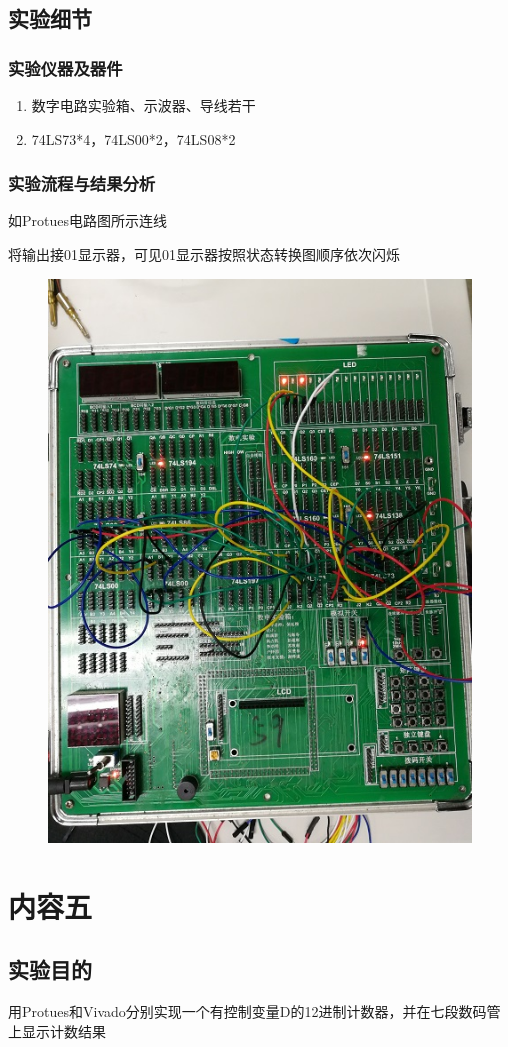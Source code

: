 \documentclass[11pt,UTF8]{ctexart}
\begin{document}
\subsection{实验细节}
\subsubsection{实验仪器及器件}
\begin{enumerate}
    \item 数字电路实验箱、示波器、导线若干
    \item 74LS73*4，74LS00*2，74LS08*2
\end{enumerate}

\subsubsection{实验流程与结果分析}
\par 如Protues电路图所示连线
\par 将输出接01显示器，可见01显示器按照状态转换图顺序依次闪烁
\begin{figure}[H]
    \centering
    \includegraphics[width=0.6\linewidth]{fig/broad_12system.jpg}
\end{figure}



\section{内容五}
\subsection{实验目的}
用Protues和Vivado分别实现一个有控制变量D的12进制计数器，并在七段数码管上显示计数结果
\end{document}
